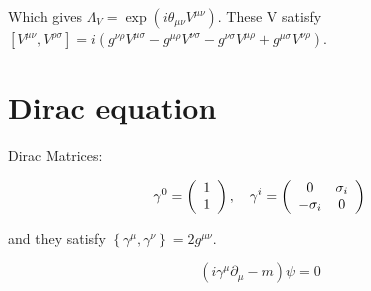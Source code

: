 Which gives $\Lambda _ { V } = \exp \left( i \theta _ { \mu \nu } V ^ { \mu \nu } \right)$. These V satisfy $\left[ V ^ { \mu \nu } , V ^ { \rho \sigma } \right] = i \left( g ^ { \nu \rho } V ^ { \mu \sigma } - g ^ { \mu \rho } V ^ { \nu \sigma } - g ^ { \nu \sigma } V ^ { \mu \rho } + g ^ { \mu \sigma } V ^ { \nu \rho } \right)$.

\section{Dirac equation}

Dirac Matrices:

\begin{equation}
    \gamma ^ { 0 } = \left( \begin{array} { c } { 1 } \\ { 1 } \end{array} \right) , \quad \gamma ^ { i } = \left( \begin{array} { c c } { 0 } & { \sigma _ { i } } \\ { - \sigma _ { i } } & { 0 } \end{array} \right)
\end{equation}

and they satisfy $\left\{ \gamma ^ { \mu } , \gamma ^ { \nu } \right\} = 2 g ^ { \mu \nu }$.


\begin{equation}
    \left( i \gamma ^ { \mu } \partial _ { \mu } - m \right) \psi = 0
\end{equation}

